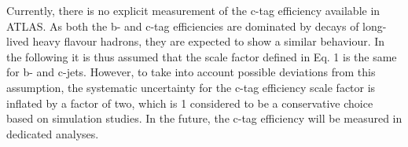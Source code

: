 Currently, there is no explicit measurement of the c-tag efficiency available in ATLAS. As both the
b- and c-tag efficiencies are dominated by decays of long-lived heavy flavour hadrons, they are expected
to show a similar behaviour. In the following it is thus assumed that the scale factor defined in Eq. 1
is the same for b- and c-jets. However, to take into account possible deviations from this assumption,
the systematic uncertainty for the c-tag efficiency scale factor is inflated by a factor of two, which is
1
considered to be a conservative choice based on simulation studies. In the future, the c-tag efficiency
will be measured in dedicated analyses.





